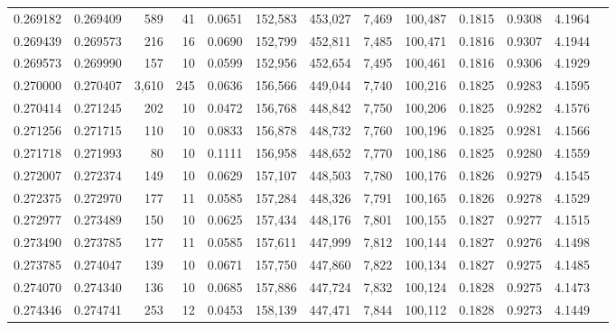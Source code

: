 \begin{tabular}{rrrrrrrrrrrrr}
0.269182 & 0.269409 &   589 &  41 &                                     0.0651 & 152,583 & 453,027 &   7,469 & 100,487 & 0.1815 & 0.9308 & 4.1964 \\
0.269439 & 0.269573 &   216 &  16 &                                     0.0690 & 152,799 & 452,811 &   7,485 & 100,471 & 0.1816 & 0.9307 & 4.1944 \\
0.269573 & 0.269990 &   157 &  10 &                                     0.0599 & 152,956 & 452,654 &   7,495 & 100,461 & 0.1816 & 0.9306 & 4.1929 \\
0.270000 & 0.270407 & 3,610 & 245 &                                     0.0636 & 156,566 & 449,044 &   7,740 & 100,216 & 0.1825 & 0.9283 & 4.1595 \\
0.270414 & 0.271245 &   202 &  10 &                                     0.0472 & 156,768 & 448,842 &   7,750 & 100,206 & 0.1825 & 0.9282 & 4.1576 \\
0.271256 & 0.271715 &   110 &  10 &                                     0.0833 & 156,878 & 448,732 &   7,760 & 100,196 & 0.1825 & 0.9281 & 4.1566 \\
0.271718 & 0.271993 &    80 &  10 &                                     0.1111 & 156,958 & 448,652 &   7,770 & 100,186 & 0.1825 & 0.9280 & 4.1559 \\
0.272007 & 0.272374 &   149 &  10 &                                     0.0629 & 157,107 & 448,503 &   7,780 & 100,176 & 0.1826 & 0.9279 & 4.1545 \\
0.272375 & 0.272970 &   177 &  11 &                                     0.0585 & 157,284 & 448,326 &   7,791 & 100,165 & 0.1826 & 0.9278 & 4.1529 \\
0.272977 & 0.273489 &   150 &  10 &                                     0.0625 & 157,434 & 448,176 &   7,801 & 100,155 & 0.1827 & 0.9277 & 4.1515 \\
0.273490 & 0.273785 &   177 &  11 &                                     0.0585 & 157,611 & 447,999 &   7,812 & 100,144 & 0.1827 & 0.9276 & 4.1498 \\
0.273785 & 0.274047 &   139 &  10 &                                     0.0671 & 157,750 & 447,860 &   7,822 & 100,134 & 0.1827 & 0.9275 & 4.1485 \\
0.274070 & 0.274340 &   136 &  10 &                                     0.0685 & 157,886 & 447,724 &   7,832 & 100,124 & 0.1828 & 0.9275 & 4.1473 \\
0.274346 & 0.274741 &   253 &  12 &                                     0.0453 & 158,139 & 447,471 &   7,844 & 100,112 & 0.1828 & 0.9273 & 4.1449 \\

\end{tabular}
